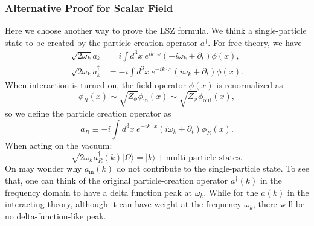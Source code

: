 \subsubsection{Alternative Proof for Scalar Field}
Here we choose another way to prove the LSZ formula.
We think a single-particle state to be created by the particle creation operator $a^\dagger$.
For free theory, we have
\begin{equation}
\begin{aligned}
	\sqrt{2\omega_k} a_k &= i \int d^3 x\ e^{ik\cdot x}(-i\omega_k+\partial_t)\phi(x), \\
	\sqrt{2\omega_k} a^\dagger_k &= -i \int d^3 x\ e^{-ik\cdot x}(i\omega_k+\partial_t)\phi(x).
\end{aligned}
\end{equation}
When interaction is turned on, the field operator $\phi(x)$ is renormalized as
\begin{equation*}
	\phi_R(x) \sim \sqrt{Z_{\phi}} \phi_{\mathrm{in}}(x) \sim \sqrt{Z_{\phi}} \phi_{\mathrm{out}}(x),
\end{equation*}
so we define the particle creation operator as
\begin{equation}
	a_R^\dagger \equiv -i \int d^3 x\ e^{-ik\cdot x}(i\omega_k+\partial_t)\phi_R(x).
\end{equation}
When acting on the vacuum:
\begin{equation}
	\sqrt{2\omega_k} a_R^\dagger(k) |\Omega\rangle = |k\rangle + \text{multi-particle states}.
\end{equation}
On may wonder why $a_{\mathrm{in}}(k)$ do not contribute to the single-particle state. 
To see that, one can think of the original particle-creation operator $a^\dagger(k)$ in the frequency domain to have a delta function peak at $\omega_k$.
While for the $a(k)$ in the interacting theory, although it can have weight at the frequency $\omega_k$, there will be no delta-function-like peak.

